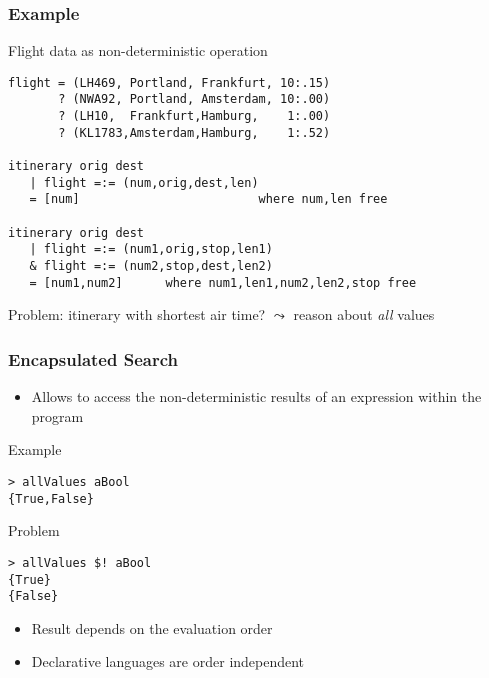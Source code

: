 \documentclass[utf8]{beamer}
\begin{document}
\begin{frame}[fragile]
\frametitle{Example}
\begin{block}{Flight data as non-deterministic operation}
\begin{lstlisting}[mathescape]
flight = (LH469, Portland, Frankfurt, 10:.15)
       ? (NWA92, Portland, Amsterdam, 10:.00)
       ? (LH10,  Frankfurt,Hamburg,    1:.00)
       ? (KL1783,Amsterdam,Hamburg,    1:.52)
       
itinerary orig dest 
   | flight =:= (num,orig,dest,len)
   = [num]                         where num,len free

itinerary orig dest 
   | flight =:= (num1,orig,stop,len1)
   & flight =:= (num2,stop,dest,len2)
   = [num1,num2]      where num1,len1,num2,len2,stop free
\end{lstlisting}
\end{block}
\pause
Problem: itinerary with shortest air time? $\leadsto$ reason about \emph{all} values
\end{frame}

\begin{frame}[fragile]
\frametitle{Encapsulated Search}
\begin{itemize}
\item Allows to access the non-deterministic results of an expression
      within the program
\end{itemize}
\begin{block}{Example}
\begin{lstlisting}
> allValues aBool
{True,False}
\end{lstlisting}
\end{block}
\pause
\begin{block}{Problem}
\begin{lstlisting}
> allValues $! aBool
{True}
{False}
\end{lstlisting}%
\end{block}
\begin{itemize}
\item Result depends on the evaluation order
\item Declarative languages are order independent 
\end{itemize}
\end{frame}
\end{document}
